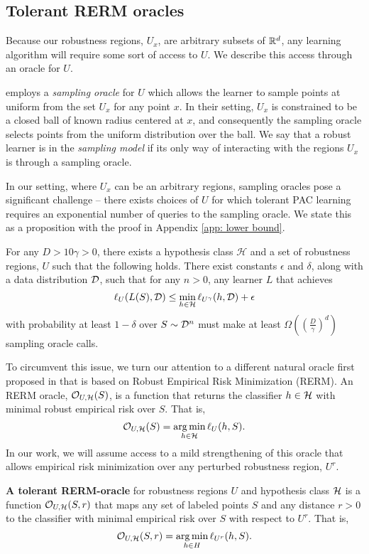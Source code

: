 \subsection{Tolerant RERM oracles}

Because our robustness regions, $U_x$, are arbitrary subsets of $\mathbb{R}^d$, any learning algorithm will require some sort of access to $U$. We describe this access through an oracle for $U$. 

\citet{Urner22} employs a \textit{sampling oracle} for $U$ which allows the learner to sample points at uniform from the set $U_x$ for any point $x$. In their setting, $U_x$ is constrained to be a closed ball of known radius centered at $x$, and consequently the sampling oracle selects points from the uniform distribution over the ball. We say that a robust learner is in the \textit{sampling model} if its only way of interacting with the regions $U_x$ is through a sampling oracle.

In our setting, where $U_x$ can be an arbitrary regions, sampling oracles pose a significant challenge -- there exists choices of $U$ for which tolerant PAC learning requires an exponential number of queries to the sampling oracle. We state this as a proposition with the proof in Appendix \ref{app: lower bound}.
\begin{prop}\label{prop: lowerbound}
For any $D>10\gamma > 0$, there exists a hypothesis class $\mathcal{H}$ and a set of robustness regions, $U$ such that the following holds. There exist constants $\epsilon$ and $\delta$, along with a data distribution $\mathcal D$, such that for any $n > 0$, any learner $L$ that achieves $$\ell_U(L(S), \mathcal D) \leq \min_{h \in \mathcal H} \ell_{U^\gamma}(h, \mathcal D) + \epsilon$$ with probability at least $1-\delta$ over $S \sim \mathcal D^n$ must make at least $\Omega\left(\left(\frac{D}{\gamma}\right)^d\right)$ sampling oracle calls.
\end{prop}

To circumvent this issue, we turn our attention to a different natural oracle first proposed in \citet{Srebro19} that is based on Robust Empirical Risk Minimization (RERM). An RERM oracle, $\mathcal O_{U, \mathcal H}(S)$, is a function that returns the classifier $h \in \mathcal H$ with minimal robust empirical risk over $S$. That is, $$\mathcal O_{U, \mathcal H}(S) = \operatorname*{arg\,min}_{h \in \mathcal H} \ell_U(h, S).$$ In our work, we will assume access to a mild strengthening of this oracle that allows empirical risk minimization over any perturbed robustness region, $U^r$.

\begin{defn}\label{defn:oracle}
\textbf{A tolerant RERM-oracle} for robustness regions $U$ and hypothesis class $\mathcal H$ is a function $\mathcal O_{U, \mathcal H}(S, r)$ that maps any set of labeled points $S$ and any distance $r > 0$ to the classifier with minimal empirical risk over $S$ with respect to $U^r$. That is, $$\mathcal O_{U, \mathcal H}(S, r) = \operatorname*{arg\,min}_{h \in H} \ell_{U^r}(h, S).$$
\end{defn}

